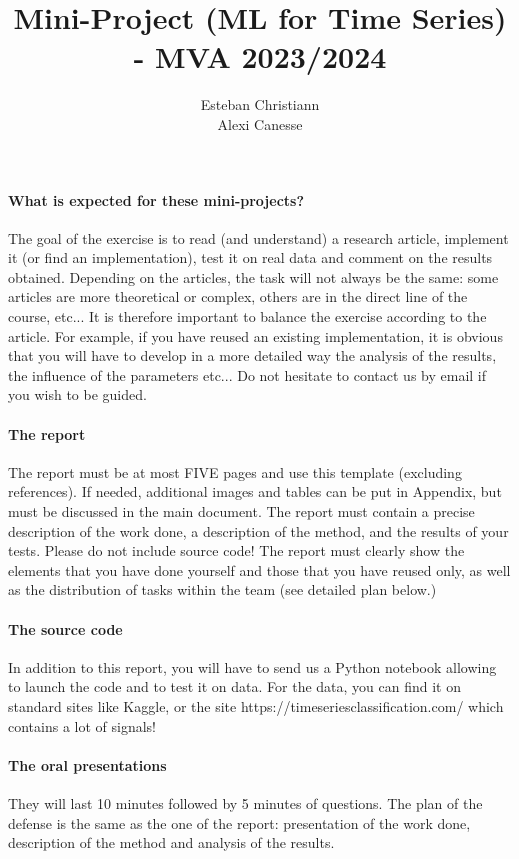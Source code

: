 \documentclass[11pt]{article}
\title{Mini-Project (ML for Time Series) - MVA 2023/2024}
\author{
Esteban Christiann \email{mailto:esteban.christiann@ens-paris-saclay.fr} \\ %
Alexi Canesse \email{mailto:alexi.canesse@ens-lyon.fr} %
}
\begin{document}
\maketitle

\paragraph{What is expected for these mini-projects?}
The goal of the exercise is to read (and understand) a research article, implement it (or find an implementation), test it on real data and comment on the results obtained.
Depending on the articles, the task will not always be the same: some articles are more theoretical or complex, others are in the direct line of the course, etc... It is therefore important to balance the exercise according to the article. For example, if you have reused an existing implementation, it is obvious that you will have to develop in a more detailed way the analysis of the results, the influence of the parameters etc... Do not hesitate to contact us by email if you wish to be guided.

\paragraph{The report}
 The report must be at most FIVE pages and use this template (excluding references). If needed, additional images and tables can be put in Appendix, but must be discussed in the main document. The report must contain a precise description of the work done, a description of the method, and the results of your tests. Please do not include source code! The report must clearly show the elements that you have done yourself and those that you have reused only, as well as the distribution of tasks within the team (see detailed plan below.)
 
 \paragraph{The source code}
In addition to this report, you will have to send us a Python notebook allowing to launch the code and to test it on data. For the data, you can find it on standard sites like Kaggle, or the site https://timeseriesclassification.com/ which contains a lot of signals!


\paragraph{The oral presentations}
They will last 10 minutes followed by 5 minutes of questions. The plan of the defense is the same as the one of the report: presentation of the work done, description of the method and analysis of the results.
\end{document}
